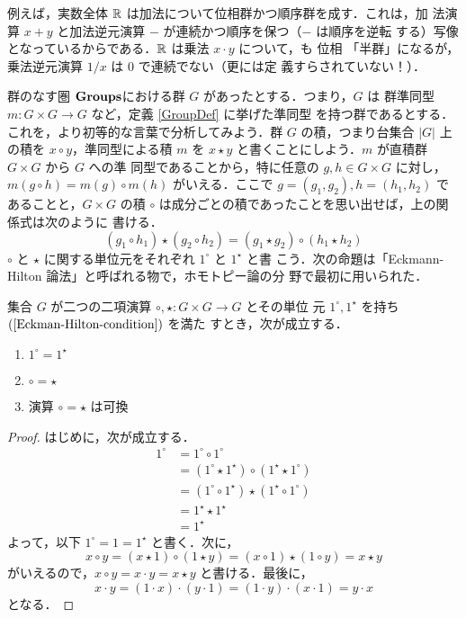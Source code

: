 例えば，実数全体 $\mathbb{R}$ は加法について位相群かつ順序群を成す．これは，加
法演算 $x+y$ と加法逆元演算 $-$ が連続かつ順序を保つ（$-$ は順序を逆転
する）写像となっているからである．$\mathbb{R}$ は乗法 $x \cdot y$ について，も
位相 「半群」になるが，乗法逆元演算 $1/x$ は $0$ で連続でない（更には定
義すらされていない！）．

\begin{example}
 群のなす圏 ${\bf Groups}$における群 $G$ があったとする．つまり，$G$ は
 群準同型 $m: G \times G \to G$ など，定義 \ref{GroupDef} に挙げた準同型
 を持つ群であるとする．これを，より初等的な言葉で分析してみよう．群 $G$
 の積，つまり台集合 $|G|$ 上の積を $x \circ y$，準同型による積 $m$ を $x
 \star y$ と書くことにしよう．$m$ が直積群 $G \times G$ から $G$ への準
 同型であることから，特に任意の $g, h \in G \times G$ に対し，
 $m(g \circ h) = m(g) \circ m(h)$ がいえる．ここで
 $g = (g_1, g_2), h = (h_1, h_2)$ であることと，$G \times G$ の積
 $\circ$ は成分ごとの積であったことを思い出せば，上の関係式は次のように
 書ける．
 \begin{equation}
    (g_1 \circ h_1) \star (g_2 \circ h_2)
     = (g_1 \star g_2) \circ (h_1 \star h_2)\label{Eckman-Hilton-condition}
 \end{equation}
 $\circ$ と $\star$ に関する単位元をそれぞれ $1^\circ$ と $1^\star$ と書
 こう．次の命題は「Eckmann-Hilton 論法」と呼ばれる物で，ホモトピー論の分
 野で最初に用いられた．

 \begin{prop}
  集合 $G$ が二つの二項演算 $\circ, \star: G \times G \to G$ とその単位
  元 $1^\circ, 1^\star$ を持ち $(\ref{Eckman-Hilton-condition})$ を満た
  すとき，次が成立する．
  \begin{enumerate}
   \item $1^\circ = 1^\star$
   \item $\circ = \star$
   \item 演算 $\circ = \star$ は可換
  \end{enumerate}
 \end{prop}
 \begin{proof}
  はじめに，次が成立する．
  \begin{align*}
   1^\circ &= 1^\circ \circ 1^\circ \\
           &= (1^\circ \star 1^\star) \circ (1^\star \star 1^\circ) \\
           &= (1^\circ \circ 1^\star) \star (1^\star \circ 1^\circ) \\
           &= 1^\star \star 1^\star \\
           &= 1^\star
  \end{align*}
  よって，以下 $1^\circ = 1 = 1^\star$ と書く．次に，
  \[
   x \circ y = (x \star 1) \circ (1 \star y)
             = (x \circ 1) \star (1 \circ y)
             = x \star y
  \]
  がいえるので，$x \circ y = x \cdot y = x \star y$ と書ける．最後に，
  \[
   x \cdot y = (1 \cdot x) \cdot (y \cdot 1)
             = (1 \cdot y) \cdot (x \cdot 1)
             = y \cdot x
  \]
  となる．
 \end{proof}
\end{example}

